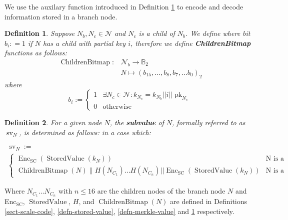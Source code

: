 \documentclass{article}
\newcommand{\assign}{:=}
\newcommand{\nobracket}{}
\newcommand{\tmop}[1]{\ensuremath{\operatorname{#1}}}
\newcommand{\tmrsub}[1]{\ensuremath{_{\textrm{#1}}}}
\newcommand{\tmstrong}[1]{\textbf{#1}}
\newcommand{\tmtextbf}[1]{{\bfseries{#1}}}
\newtheorem{definition}{Definition}
\providecommand{\nobracket}{}
\providecommand{\tmop}[1]{\ensuremath{\mathrm{#1}}}
\providecommand{\tmrsub}[1]{\tmrsub{\ensuremath{\mathrm{#1}}}}
\providecommand{\tmstrong}[1]{\tmtextbf{#1}}
\providecommand{\tmtextbf}[1]{\tmtextbf{#1}}
\newtheorem{definition}{Definition}
\begin{document}
We use the auxilary function introduced in Definition
\ref{defn-children-bitmap} to encode and decode information stored in a branch
node.

\begin{definition}
  \label{defn-children-bitmap}Suppose $N_b, N_c \in \mathcal{N}$ and $N_c$ is
  a child of $N_b$. We define where bit $b_i : = 1$ if $N$ has a child with
  partial key $i$, therefore we define {\tmstrong{ChildrenBitmap}} functions
  as follows:
  \[ \begin{array}{cc}
       \tmop{ChildrenBitmap} : & \mathcal{N}_b \rightarrow \mathbb{B}_2\\
       & N \mapsto (b_{15}, \ldots, b_8, b_7, \ldots b_0)_2
     \end{array} \]
  where
  \[ b_i \assign \left\{ \begin{array}{cc}
       1 & \exists N_c \in \mathcal{N}: k_{N_c} = k_{N_b} | | i | |
       \tmop{pk}_{N_c}\\
       0 & \text{otherwise}
     \end{array} \right. \]
\end{definition}

\begin{definition}
  \label{defn-node-subvalue}For a given node $N$, the {\tmstrong{subvalue}} of
  $N$, formally referred to as $\tmop{sv}_N$, is determined as follows: in a
  case which:
  \begin{itemize}
    \[ \begin{array}{l}
         \tmop{sv}_N \assign\\
         \left\{ \begin{array}{cc}
           \tmop{Enc}_{\tmop{SC}} (\tmop{StoredValue} (k_N)) & \text{N is a
           leaf node}\\
           \nobracket \tmop{ChildrenBitmap} (N)\|H (N_{C_1}) \ldots H
           (N_{C_n}) | | \tmop{Enc}_{\tmop{SC}} (\tmop{StoredValue} (k_N))  &
           \text{N is a branch node}
         \end{array} \right.
       \end{array} \]
  \end{itemize}
\end{definition}

Where $N_{C_1} \ldots N_{C_n}$ with $n \leqslant 16$ are the children nodes of
the branch node $N$ and Enc\tmrsub{SC}, $\tmop{StoredValue}$, $H$, and
$\tmop{ChildrenBitmap} (N)$ are defined in Definitions \ref{sect-scale-code},
\ref{defn-stored-value}, \ref{defn-merkle-value} and
\ref{defn-children-bitmap} respectively.
\end{document}
